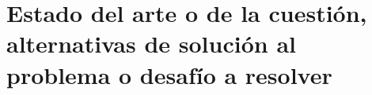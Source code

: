 \chapter{Estado del arte o de la cuestión, alternativas de solución al problema o desafío a resolver}